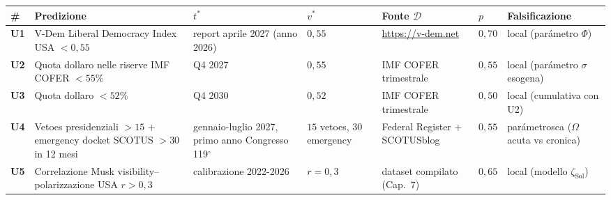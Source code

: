 {\def\LTcaptype{none} %
{\small\begin{longtable}[]{@{}
  >{\raggedright\arraybackslash}p{}
  >{\raggedright\arraybackslash}p{}
  >{\raggedright\arraybackslash}p{}
  >{\raggedright\arraybackslash}p{}
  >{\raggedright\arraybackslash}p{}
  >{\raggedright\arraybackslash}p{}
  >{\raggedright\arraybackslash}p{}@{}}
\toprule\noalign{}
\begin{minipage}[b]{\linewidth}\raggedright
\#
\end{minipage} & \begin{minipage}[b]{\linewidth}\raggedright
Predizione
\end{minipage} & \begin{minipage}[b]{\linewidth}\raggedright
\(t^*\)
\end{minipage} & \begin{minipage}[b]{\linewidth}\raggedright
\(v^*\)
\end{minipage} & \begin{minipage}[b]{\linewidth}\raggedright
Fonte \(\mathcal{D}\)
\end{minipage} & \begin{minipage}[b]{\linewidth}\raggedright
\(p\)
\end{minipage} & \begin{minipage}[b]{\linewidth}\raggedright
Falsificazione
\end{minipage} \\
\midrule\noalign{}
\endhead
\bottomrule\noalign{}
\endlastfoot
\textbf{U1} & V-Dem Liberal Democracy Index USA \(< 0{,}55\) & report
aprile 2027 (anno 2026) & \(0{,}55\) & \url{https://v-dem.net} &
\(0{,}70\) & local (parámetro \(\Phi\)) \\
\textbf{U2} & Quota dollaro nelle riserve IMF COFER \(< 55\%\) & Q4 2027
& \(0{,}55\) & IMF COFER trimestrale & \(0{,}55\) & local (parámetro
\(\sigma\) esogena) \\
\textbf{U3} & Quota dollaro \(< 52\%\) & Q4 2030 & \(0{,}52\) & IMF
COFER trimestrale & \(0{,}50\) & local (cumulativa con U2) \\
\textbf{U4} & Vetoes presidenziali \(> 15\) + emergency docket SCOTUS
\(> 30\) in 12 mesi & gennaio-luglio 2027, primo anno Congresso 119$^\circ$ &
\(15\) vetoes, \(30\) emergency & Federal Register + SCOTUSblog &
\(0{,}55\) & parámetrosca (\(\Omega\) acuta vs cronica) \\
\textbf{U5} & Correlazione Musk visibility--polarizzazione USA
\(r > 0{,}3\) & calibrazione 2022-2026 & \(r = 0{,}3\) & dataset
compilato (Cap.~7) & \(0{,}65\) & local (modello
\(\zeta_{\text{Sol}}\)) \\
\end{longtable}}
}

